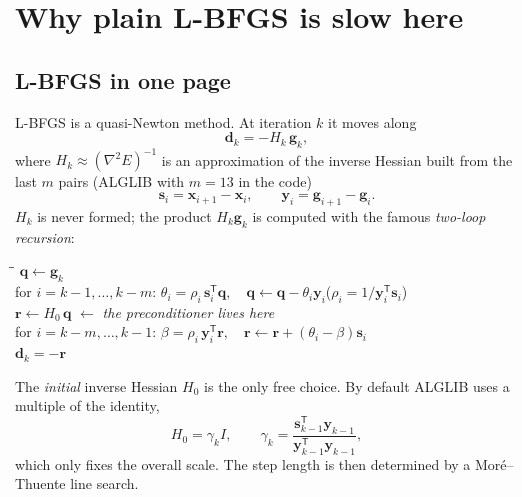 \documentclass[11pt,a4paper]{article}
\theoremstyle{remark}
\newcommand{\x}{\bm{x}}
\newcommand{\g}{\bm{g}}
\newcommand{\s}{\bm{s}}
\newcommand{\y}{\bm{y}}
\newcommand{\dd}{\bm{d}}
\newcommand{\T}{^{\mathsf T}}
\begin{document}
\section{Why plain L-BFGS is slow here}
\label{sec:slow}

\subsection{L-BFGS in one page}

L-BFGS is a quasi-Newton method. At iteration $k$ it moves along
\begin{equation}
\dd_k = -H_k\,\g_k,
\end{equation}
where $H_k\approx(\nabla^2E)^{-1}$ is an approximation of the inverse Hessian built from
the last $m$ pairs (ALGLIB with $m=13$ in the code)
\begin{equation}
\s_i = \x_{i+1}-\x_i,\qquad \y_i = \g_{i+1}-\g_i .
\end{equation}
$H_k$ is never formed; the product $H_k\g_k$ is computed with the famous
\emph{two-loop recursion}:
\begin{center}
\begin{minipage}{0.8\textwidth}
\begin{tabbing}
\quad\=\quad\=\kill
$\bm q \leftarrow \g_k$\\
for $i=k-1,\dots,k-m$:\> \> $\theta_i = \rho_i\,\s_i\T\bm q,\quad \bm q \leftarrow \bm q - \theta_i\y_i$\qquad ($\rho_i = 1/\y_i\T\s_i$)\\
$\bm r \leftarrow H_0\,\bm q$ \hspace{3em} $\longleftarrow$ \emph{the preconditioner lives here}\\
for $i=k-m,\dots,k-1$:\> \> $\beta = \rho_i\,\y_i\T\bm r,\quad \bm r \leftarrow \bm r + (\theta_i-\beta)\s_i$\\
$\dd_k = -\bm r$
\end{tabbing}
\end{minipage}
\end{center}
The \emph{initial} inverse Hessian $H_0$ is the only free choice. By default ALGLIB uses a
multiple of the identity,
\begin{equation}
H_0 = \gamma_k I,\qquad \gamma_k = \frac{\s_{k-1}\T\y_{k-1}}{\y_{k-1}\T\y_{k-1}},
\end{equation}
which only fixes the overall scale. The step length is then determined by a Mor\'e--Thuente
line search.
\end{document}
